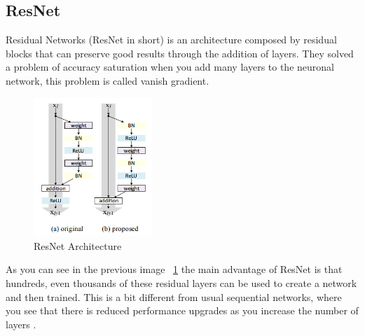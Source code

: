 \subsection[ResNet]{ResNet}

Residual Networks (ResNet in short) is an architecture composed by residual blocks that can preserve good results through the addition of layers. They solved a problem of accuracy saturation when you add many layers to the neuronal network, this problem is called vanish gradient.

\begin{figure}[H]
\centering
\includegraphics[width=0.4\textwidth]{./figures/ResNet}
\caption{ResNet Architecture \cite{advances-architectures}}
\label{fig:resnet}
\end{figure}

As you can see in the previous image ~\ref{fig:resnet} the main advantage of ResNet is that hundreds, even thousands of these residual layers can be used to create a network and then trained. This is a bit different from usual sequential networks, where you see that there is reduced performance upgrades as you increase the number of layers \cite{advances-architectures}.


